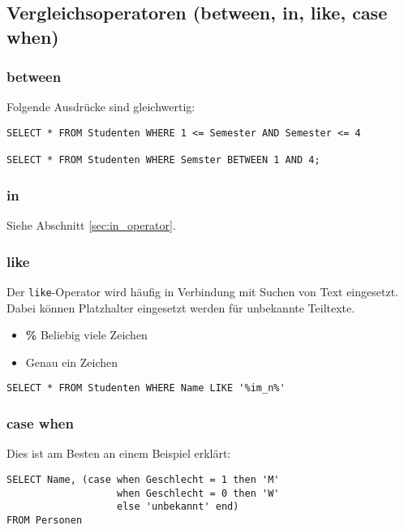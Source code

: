 \subsection{Vergleichsoperatoren (between, in, like, case when)}
\subsubsection{between}
Folgende Ausdrücke sind gleichwertig:

\begin{lstlisting}[caption={Beispiel between}]
SELECT * FROM Studenten WHERE 1 <= Semester AND Semester <= 4
        
SELECT * FROM Studenten WHERE Semster BETWEEN 1 AND 4;
\end{lstlisting}

\subsubsection{in}
Siehe Abschnitt \ref{sec:in_operator}.

\subsubsection{like}
Der \texttt{like}-Operator wird häufig in Verbindung mit Suchen von Text eingesetzt. Dabei können Platzhalter eingesetzt werden für unbekannte Teiltexte.
\begin{itemize}
  \item \textbf{\%} Beliebig viele Zeichen
  \item \textbf{\underline {{ }{ }}} Genau ein Zeichen
\end{itemize}

\begin{lstlisting}[caption={Beispiel für like Operator}]
SELECT * FROM Studenten WHERE Name LIKE '%im_n%'
\end{lstlisting}

\subsubsection{case when}
Dies ist am Besten an einem Beispiel erklärt:

\begin{lstlisting}[caption={Beispiel für case when}]
SELECT Name, (case when Geschlecht = 1 then 'M'
                   when Geschlecht = 0 then 'W'
                   else 'unbekannt' end)
FROM Personen
\end{lstlisting}

